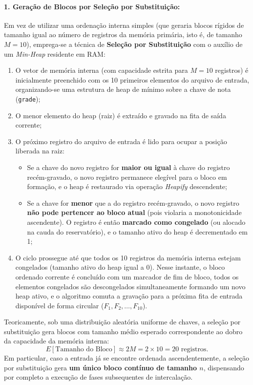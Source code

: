 \documentclass[12pt,a4paper]{article}
\begin{document}
\paragraph{1. Geração de Blocos por Seleção por Substituição:}
Em vez de utilizar uma ordenação interna simples (que geraria blocos rígidos de tamanho igual ao número de registros da memória primária, isto é, de tamanho $M = 10$), emprega-se a técnica de \textbf{Seleção por Substituição} com o auxílio de um \textit{Min-Heap} residente em RAM:
\begin{enumerate}
    \item O vetor de memória interna (com capacidade estrita para $M = 10$ registros) é inicialmente preenchido com os 10 primeiros elementos do arquivo de entrada, organizando-se uma estrutura de heap de mínimo sobre a chave de nota (\texttt{grade});
    \item O menor elemento do heap (raiz) é extraído e gravado na fita de saída corrente;
    \item O próximo registro do arquivo de entrada é lido para ocupar a posição liberada na raiz:
    \begin{itemize}
        \item Se a chave do novo registro for \textbf{maior ou igual} à chave do registro recém-gravado, o novo registro permanece elegível para o bloco em formação, e o heap é restaurado via operação \textit{Heapify} descendente;
        \item Se a chave for \textbf{menor} que a do registro recém-gravado, o novo registro \textbf{não pode pertencer ao bloco atual} (pois violaria a monotonicidade ascendente). O registro é então \textbf{marcado como congelado} (ou alocado na cauda do reservatório), e o tamanho ativo do heap é decrementado em 1;
    \end{itemize}
    \item O ciclo prossegue até que todos os 10 registros da memória interna estejam congelados (tamanho ativo do heap igual a 0). Nesse instante, o bloco ordenado corrente é concluído com um marcador de fim de bloco, todos os elementos congelados são descongelados simultaneamente formando um novo heap ativo, e o algoritmo comuta a gravação para a próxima fita de entrada disponível de forma circular ($F_1, F_2, \dots, F_{10}$).
\end{enumerate}

Teoricamente, sob uma distribuição aleatória uniforme de chaves, a seleção por substituição gera blocos com tamanho médio esperado correspondente ao dobro da capacidade da memória interna:
\begin{equation}
    E[\text{Tamanho do Bloco}] \approx 2M = 2 \times 10 = 20 \text{ registros}.
\end{equation}
Em particular, caso a entrada já se encontre ordenada ascendentemente, a seleção por substituição gera \textbf{um único bloco contínuo de tamanho $n$}, dispensando por completo a execução de fases subsequentes de intercalação.
\end{document}
